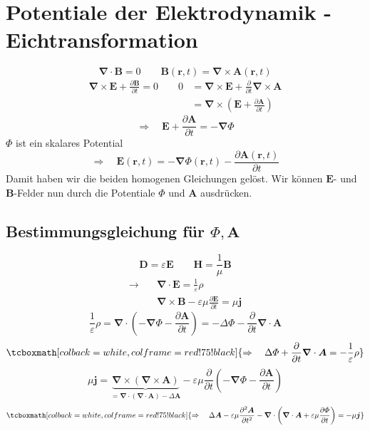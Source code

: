 \documentclass[titlepage,11pt,a4paper,ngerman]{report}
\newcommand{\ub}[1]{\underbrace{#1}}
\newcommand{\prt}[2]{\frac{\partial #1}{\partial #2}}
\renewcommand{\Phi}{\varPhi}
\renewcommand{\vec}[1]{\boldsymbol{#1}}
\renewcommand{\epsilon}{\varepsilon}
\newcommand{\vabla}{\boldsymbol{\nabla}}
\newcommand{\rmbox}[1]{\tcboxmath[colback=white,colframe=red!75!black]{#1}}
\begin{document}
\section{Potentiale der Elektrodynamik - Eichtransformation}

\begin{equation*}
\vabla \cdot \vec{B} = 0 \qquad \vec{B}(\vec{r},t) = \vabla \times \vec{A}(\vec{r},t)
\end{equation*}
\begin{align*}
\vabla \times \vec{E} + \prt{\vec{B}}{t} = 0 \qquad 0 &= \vabla \times \vec{E} + \prt{}{t} \vabla \times \vec{A} \\
&= \vabla \times \left(\vec{E} + \prt{\vec{A}}{t}\right)
\end{align*}
\begin{equation*}
\Rightarrow \quad \vec{E} + \prt{\vec{A}}{t} = - \vabla \Phi
\end{equation*}
$ \Phi $ ist ein skalares Potential
\begin{equation*}
\Rightarrow \quad \vec{E}(\vec{r},t) = - \vabla \Phi(\vec{r},t) - \prt{\vec{A}(\vec{r},t)}{t}
\end{equation*}
Damit haben wir die beiden homogenen Gleichungen gelöst. Wir können $ \vec{E} $- und $ \vec{B} $-Felder nun durch die Potentiale $ \Phi $ und $ \vec{A} $ ausdrücken.

\subsection{Bestimmungsgleichung für $ \Phi , \vec{A} $}

\begin{equation*}
\vec{D} = \epsilon \vec{E} \qquad \vec{H} = \frac{1}{\mu} \vec{B}
\end{equation*}
\begin{align*}
\rightarrow \quad &\vabla \cdot \vec{E} = \frac{1}{\epsilon} \rho \\
& \vabla \times \vec{B} - \epsilon \mu \prt{\vec{E}}{t} = \mu \vec{j}
\end{align*}
\begin{equation*}
\frac{1}{\epsilon} \rho = \vabla \cdot \left(- \vabla \Phi - \prt{\vec{A}}{t}\right) = - \Delta \Phi - \prt{}{t} \vabla \cdot \vec{A}
\end{equation*}
\begin{equation*}
\rmbox{\Rightarrow \quad \Delta \Phi + \prt{}{t} \vabla \cdot \vec{A} = - \frac{1}{\epsilon} \rho}
\end{equation*}
\begin{equation*}
\mu \vec{j} = \ub{\vabla \times (\vabla \times \vec{A})}_{=\vabla \cdot (\vabla \cdot \vec{A}) - \Delta \vec{A}} - \epsilon \mu \prt{}{t} \left(- \vabla \Phi - \prt{\vec{A}}{t}\right)
\end{equation*}
\begin{equation*}
\rmbox{\Rightarrow \quad \Delta \vec{A} - \epsilon \mu \prt{^2 \vec{A}}{t^2} - \vabla \cdot \left(\vabla \cdot \vec{A} + \epsilon \mu \prt{\Phi}{t}\right) = - \mu \vec{j}}
\end{equation*}
\end{document}
